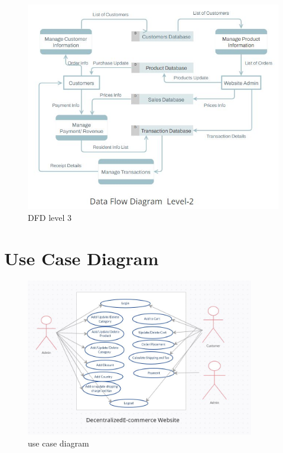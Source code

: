 \documentclass{report}
\begin{document}
\begin{figure}[h]
    \centering
    
    \begin{minipage}{0.45\textwidth}
    \centering
    \includegraphics[width=1\textwidth]{dfd/dfd_level_2.jpeg}
    \caption{DFD level 3}
    \label{fig:3}
    \end{minipage}
    \hfill
    
    

\end{figure}

\newpage

\section{Use Case Diagram}
\begin{figure}[h]
    \centering
    \includegraphics[width=10cm]{use_case_diagram/usecase_diagram.jpeg}
    \caption{use case diagram}
    \label{}
\end{figure}
\end{document}

